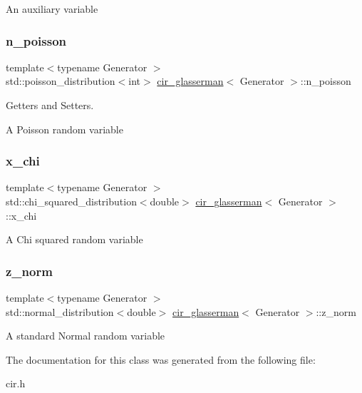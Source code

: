An auxiliary variable \mbox{\label{classcir__glasserman_aed2bd8f09e275a2fd0012989771c61f7}} 
\subsubsection{\texorpdfstring{n\+\_\+poisson}{n\_poisson}}
{\footnotesize\ttfamily template$<$typename Generator $>$ \\
std\+::poisson\+\_\+distribution$<$int$>$ \mbox{\hyperlink{classcir__glasserman}{cir\+\_\+glasserman}}$<$ Generator $>$\+::n\+\_\+poisson\hspace{0.3cm}{\ttfamily [protected]}}



Getters and Setters. 

A Poisson random variable \mbox{\label{classcir__glasserman_a1f91410b367839c4b81e8e89e9597848}} 
\subsubsection{\texorpdfstring{x\+\_\+chi}{x\_chi}}
{\footnotesize\ttfamily template$<$typename Generator $>$ \\
std\+::chi\+\_\+squared\+\_\+distribution$<$double$>$ \mbox{\hyperlink{classcir__glasserman}{cir\+\_\+glasserman}}$<$ Generator $>$\+::x\+\_\+chi\hspace{0.3cm}{\ttfamily [protected]}}

A Chi squared random variable \mbox{\label{classcir__glasserman_ab16c1db0bb521957833f67c690b6b8a4}} 
\subsubsection{\texorpdfstring{z\+\_\+norm}{z\_norm}}
{\footnotesize\ttfamily template$<$typename Generator $>$ \\
std\+::normal\+\_\+distribution$<$double$>$ \mbox{\hyperlink{classcir__glasserman}{cir\+\_\+glasserman}}$<$ Generator $>$\+::z\+\_\+norm\hspace{0.3cm}{\ttfamily [protected]}}

A standard Normal random variable 

The documentation for this class was generated from the following file\+:\begin{DoxyCompactItemize}
\item 
cir.\+h\end{DoxyCompactItemize}
